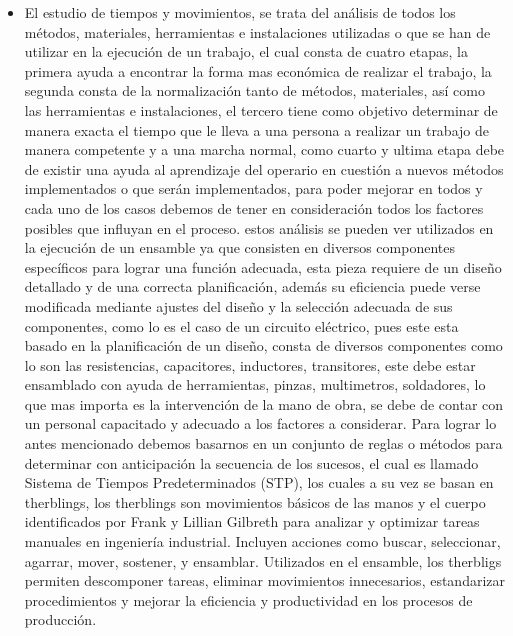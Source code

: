     \begin{itemize}
        \item El estudio de tiempos y movimientos, se trata del análisis de todos los métodos, materiales, herramientas e instalaciones utilizadas o que se han de utilizar en la ejecución de un trabajo, el cual consta de cuatro etapas, la primera ayuda a encontrar la forma mas económica de realizar el trabajo, la segunda consta de la normalización tanto de métodos, materiales, así como las herramientas e instalaciones, el tercero tiene como objetivo determinar de manera exacta el tiempo que le lleva a una persona a realizar un trabajo de manera competente y a una marcha normal, como cuarto y ultima etapa debe de existir una ayuda al aprendizaje del operario en cuestión a nuevos métodos implementados o que serán implementados, para poder mejorar en todos y cada uno de los casos debemos de tener en consideración todos los factores posibles que influyan en el proceso. estos análisis se pueden ver utilizados en la ejecución de un ensamble ya que consisten en diversos componentes específicos para lograr una función adecuada, esta pieza requiere de un diseño detallado y de una correcta planificación, además su eficiencia puede verse modificada mediante ajustes del diseño y la selección adecuada de sus componentes, como lo es el caso de un circuito eléctrico, pues este esta basado en la planificación de un diseño, consta de diversos componentes como lo son las resistencias, capacitores, inductores, transitores, este debe estar ensamblado con ayuda de herramientas, pinzas, multimetros, soldadores, lo que mas importa es la intervención de la mano de obra, se debe de contar con un personal capacitado y adecuado a los factores a considerar. Para lograr lo antes mencionado debemos basarnos en un conjunto de reglas o métodos para determinar con anticipación la secuencia de los sucesos, el cual es llamado Sistema de Tiempos Predeterminados (STP), los cuales a su vez se basan en therblings, los therblings son movimientos básicos de las manos y el cuerpo identificados por Frank y Lillian Gilbreth para analizar y optimizar tareas manuales en ingeniería industrial. Incluyen acciones como buscar, seleccionar, agarrar, mover, sostener, y ensamblar. Utilizados en el ensamble, los therbligs permiten descomponer tareas, eliminar movimientos innecesarios, estandarizar procedimientos y mejorar la eficiencia y productividad en los procesos de producción.
    \end{itemize}

